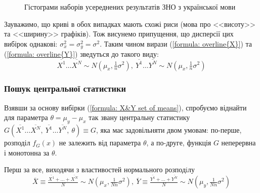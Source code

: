 \begin{figure}[H]
    \caption{Гістограми наборів усереднених результатів ЗНО з української мови}
    \label{fig:UKR means data}
\end{figure}

\newpage
Зауважимо, що криві в обох випадках мають схожі риси (мова про <<висоту>> та <<ширину>> графіків). Тож 
висунемо припущення, що дисперсії цих вибірок однакові: $\sigma_x^2=\sigma_y^2=\sigma^2$. Таким чином 
вирази (\ref{formula: overline{X}}) та (\ref{formula: overline{Y}}) зведуться до такого виду:
\begin{equation}
    \overline{X^1}\ldots \overline{X^N}\sim N(\mu_x,\tfrac{1}{n}\sigma^2),\ 
    \overline{Y^1}\ldots \overline{Y^N}\sim N(\mu_x,\tfrac{1}{n}\sigma^2) \label{formula: X&Y set of means}
\end{equation}

\subsubsection*{Пошук центральної статистики}
\label{seaching central statistic}

Взявши за основу вибірки (\ref{formula: X&Y set of means}), спробуємо віднайти для параметра 
$\theta=\mu_y-\mu_x$ так звану центральну статистику 
$G(\overline{X^1}\ldots \overline{X^N},\ \overline{Y^1}\ldots \overline{Y^N},\ \theta)\equiv G$, яка має 
задовільняти двом умовам: по-перше, розподіл $f_G(x)$ не залежить від параметра $\theta$, а по-друге, 
функція $G$ неперервна і монотонна за $\theta$.

Перш за все, виходячи з властивостей нормального розподiлу
\begin{equation*} 
    \overline{X}\equiv \tfrac{\overline{X^1}+\ldots +\overline{X^N}}{N} \sim N(\mu_x,\tfrac{1}{Nn}\sigma^2),\ 
    \overline{Y}\equiv \tfrac{\overline{Y^1}+\ldots +\overline{Y^N}}{N} \sim N(\mu_y,\tfrac{1}{Nn}\sigma^2)
\end{equation*}

